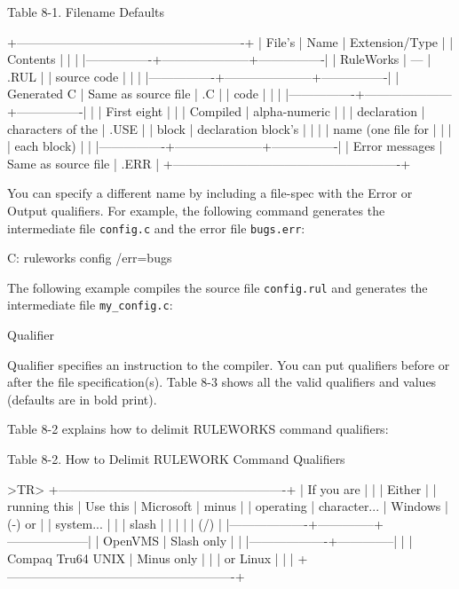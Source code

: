 Table 8-1. Filename Defaults

+-------------------------------------------------------+
| File's         | Name                | Extension/Type |
| Contents       |                     |                |
|----------------+---------------------+----------------|
| RuleWorks      | ---                 | .RUL           |
| source code    |                     |                |
|----------------+---------------------+----------------|
| Generated C    | Same as source file | .C             |
| code           |                     |                |
|----------------+---------------------+----------------|
|                | First eight         |                |
| Compiled       | alpha-numeric       |                |
| declaration    | characters of the   | .USE           |
| block          | declaration block's |                |
|                | name (one file for  |                |
|                | each block)         |                |
|----------------+---------------------+----------------|
| Error messages | Same as source file | .ERR           |
+-------------------------------------------------------+

You can specify a different name by including a file-spec
with the Error or Output qualifiers. For example, the
following command generates the intermediate file
\verb|config.c| and the error file \verb|bugs.err|:
\begin{qv}
C:\> ruleworks config /err=bugs
\end{qv}
The following example compiles the source file \verb|config.rul|
and generates the intermediate file \verb|my_config.c|:
\begin{qv}
\end{qv}

Qualifier

Qualifier specifies an instruction to the compiler. You
can put qualifiers before or after the file
specification(s). Table 8-3 shows all the valid
qualifiers and values (defaults are in bold print).

Table 8-2 explains how to delimit RULEWORKS command
qualifiers:

Table 8-2. How to Delimit RULEWORK Command Qualifiers

>TR>
+-------------------------------------------------------+
| If you are        |              |           | Either |
| running this      | Use this     | Microsoft | minus  |
| operating         | character... | Windows   | (-) or |
| system...         |              |           | slash  |
|                   |              |           | (/)    |
|-------------------+--------------+--------------------|
| OpenVMS           | Slash only   |                    |
|-------------------+--------------|                    |
| Compaq Tru64 UNIX | Minus only   |                    |
| or Linux          |              |                    |
+-------------------------------------------------------+

